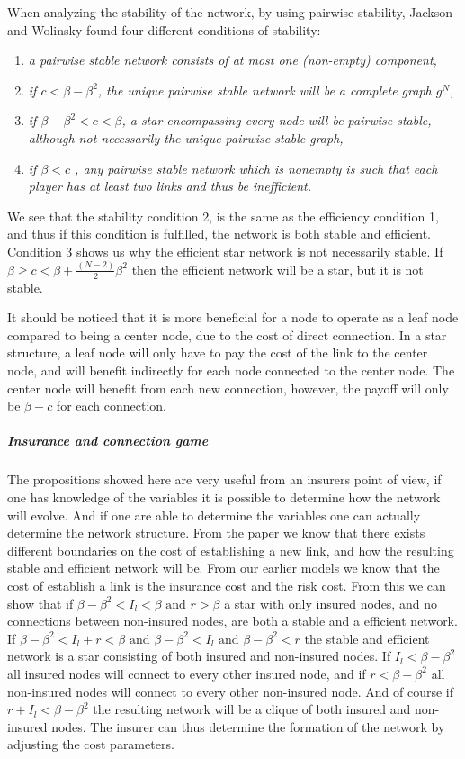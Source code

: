 When analyzing the stability of the network, by using pairwise stability, Jackson and Wolinsky found four different conditions of stability:

\begin{enumerate}
\item \textit{a pairwise stable network consists of at most one (non-empty) component,}
\item \textit{if $c<\beta - \beta^2$, the unique pairwise stable network will be a complete graph $g^N$, }
\item \textit{if $\beta - \beta^2 <c < \beta $, a star encompassing every node will be pairwise stable, although not necessarily the unique pairwise stable graph,}
\item \textit{if $\beta < c$ , any pairwise stable network which is nonempty is such that each player has at least two links and thus be inefficient. }
\end{enumerate}
We see that the stability condition 2, is the same as the efficiency condition 1, and thus if this condition is fulfilled, the network is both stable and efficient. 
Condition 3 shows us why the efficient star network is not necessarily  stable. If $\beta \geq c <   \beta + \frac{(N-2)}{2}\beta^2$ then the efficient network will be a star, but it is not stable.

It should be noticed that it is more beneficial for a node to operate as a leaf node compared to being a center node, due to the cost of direct connection. In a star structure, a leaf node will only have to pay the cost of the link to the center node, and will benefit indirectly for each node connected to the center node. The center node will benefit from each new connection, however, the payoff will only be $\beta - c$ for each connection. 

\subparagraph{Insurance and connection game}
The propositions showed here are very useful from an insurers point of view, if one has knowledge of the variables it is possible to determine how the network will evolve. And if one are able to determine the variables one can actually determine the network structure.
From the paper we know that there exists different boundaries on the cost of establishing a new link, and how the resulting stable and efficient network will be.
From our earlier models we know that the cost of establish a link is the insurance cost and the risk cost. From this we can show that if $\beta - \beta^2 <I_{l}<\beta \text{ and } r>\beta$ a star with only insured nodes, and no connections between non-insured nodes, are both a stable and a efficient network. If $\beta - \beta^2 <I_{l}+r<\beta \text{ and } \beta - \beta^2<I_{l} \text{ and } \beta - \beta^2<r $ the stable and efficient network is a star consisting of both insured and non-insured nodes. If $I_{l}<\beta-\beta^2$ all insured nodes will connect to every other insured node, and if $r<\beta-\beta^2$ all non-insured nodes will connect to every other non-insured node.
And of course if $r+I_{l}<\beta-\beta^2$ the resulting network will be a clique of both insured and non-insured nodes.
The insurer can thus determine the formation of the network by adjusting the cost parameters. 

